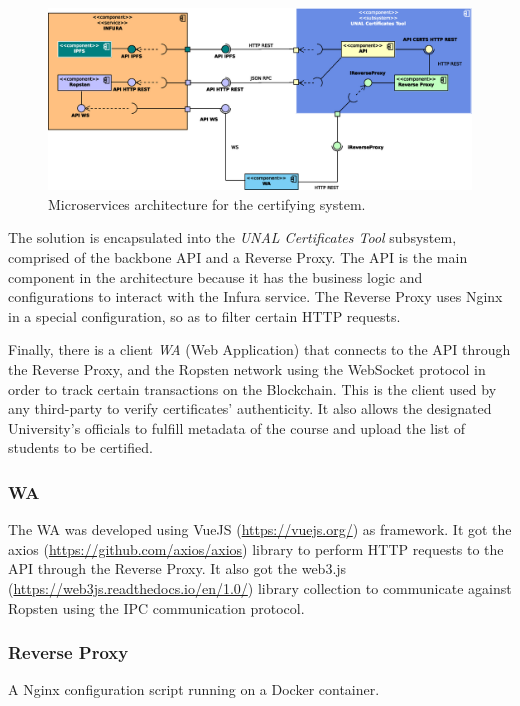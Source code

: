 \documentclass[runningheads]{llncs}
\begin{document}
\begin{figure}
\includegraphics[width=\textwidth]{01-components.eps}
\caption{Microservices architecture for the certifying system.}
\label{fig1}
\end{figure}

The solution is encapsulated into the \emph{UNAL Certificates Tool} subsystem, comprised of the backbone API and a Reverse Proxy. The API is the main component in the architecture because it has the business logic and configurations to interact with the Infura service. The Reverse Proxy uses Nginx in a special configuration, so as to filter certain HTTP requests.

Finally, there is a client \emph{WA} (Web Application) that connects to the API through the Reverse Proxy, and the Ropsten network using the WebSocket protocol in order to track certain transactions on the Blockchain. This is the client used by any third-party to verify certificates' authenticity. It also allows the designated University's officials to fulfill metadata of the course and upload the list of students to be certified.

\subsubsection{WA}
The WA was developed using VueJS (\url{https://vuejs.org/}) as framework. It got the axios (\url{https://github.com/axios/axios}) library to perform HTTP requests to the API through the Reverse Proxy. It also got the web3.js (\url{https://web3js.readthedocs.io/en/1.0/}) library collection to communicate against Ropsten using the IPC communication protocol.

\subsubsection{Reverse Proxy}
A Nginx configuration script running on a Docker container.
\end{document}
